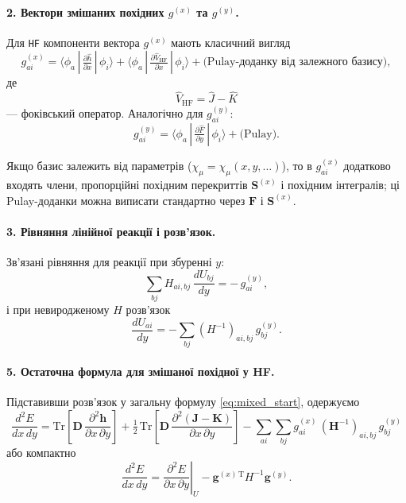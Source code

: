 \documentclass{PySCFBook}
\begin{document}
\paragraph{2. Вектори змішаних похідних \(g^{(x)}\) та \(g^{(y)}\).}
Для \texttt{HF} компоненти вектора $g^{(x)}$ мають класичний вигляд
\begin{equation}\label{eq:g_ai_HF_explicit}
g^{(x)}_{ai}
=
\langle \phi_a \,|\, \tfrac{\partial\hat h}{\partial x} \,|\, \phi_i \rangle
+
\langle \phi_a \,|\, \tfrac{\partial\hat V_{\mathrm{HF}}}{\partial x} \,|\, \phi_i \rangle
+
\text{(Pulay-доданку від залежного базису)},
\end{equation}
де
\[
\hat V_{\mathrm{HF}} = \hat J - \hat K
\]
— фоківський оператор. Аналогічно для $g^{(y)}_{ai}$:
\[
g^{(y)}_{ai}
=
\langle \phi_a \,|\, \tfrac{\partial\hat F}{\partial y} \,|\, \phi_i \rangle
+ \text{(Pulay)}.
\]

Якщо базис залежить від параметрів ($\chi_\mu=\chi_\mu(x,y,\dots)$), то в $g^{(x)}_{ai}$ додатково входять члени, пропорційні похідним перекриттів $\mathbf S^{(x)}$ і похідним інтегралів; ці Pulay-доданки можна виписати стандартно через $\mathbf F$ і $\mathbf S^{(x)}$.



\paragraph{3. Рівняння лінійної реакції і розв'язок.}
Зв'язані рівняння для реакції при збуренні $y$:
\begin{equation}\label{eq:CPHF_HF_xy}
\sum_{bj} H_{ai,bj}\,\frac{dU_{bj}}{dy} = -\,g^{(y)}_{ai},
\end{equation}
і при невиродженому $H$ розв'язок
\[
\frac{dU_{ai}}{dy} = -\sum_{bj}(H^{-1})_{ai,bj}\,g^{(y)}_{bj}.
\]

\paragraph{5. Остаточна формула для змішаної похідної у HF.}
Підставивши розв'язок у загальну формулу \eqref{eq:mixed_start}, одержуємо
\begin{equation}\label{eq:mixed_HF_final}
\frac{d^2E}{dx\,dy}
=
\mathrm{Tr}\!\left[\mathbf D\,\frac{\partial^2\mathbf h}{\partial x\,\partial y}\right]
+\tfrac12\,\mathrm{Tr}\!\left[\mathbf D\,\frac{\partial^2(\mathbf J-\mathbf K)}{\partial x\,\partial y}\right]
-
\sum_{ai}\sum_{bj} g^{(x)}_{ai}\,(\mathbf{H}^{-1})_{ai,bj}\,g^{(y)}_{bj}
\end{equation}
або компактно
\[
\frac{d^2E}{dx\,dy}
=
\left.\frac{\partial^2 E}{\partial x\,\partial y}\right|_{U}
-
\mathbf g^{(x)\,\mathrm T} H^{-1}\mathbf g^{(y)}.
\]
\end{document}
